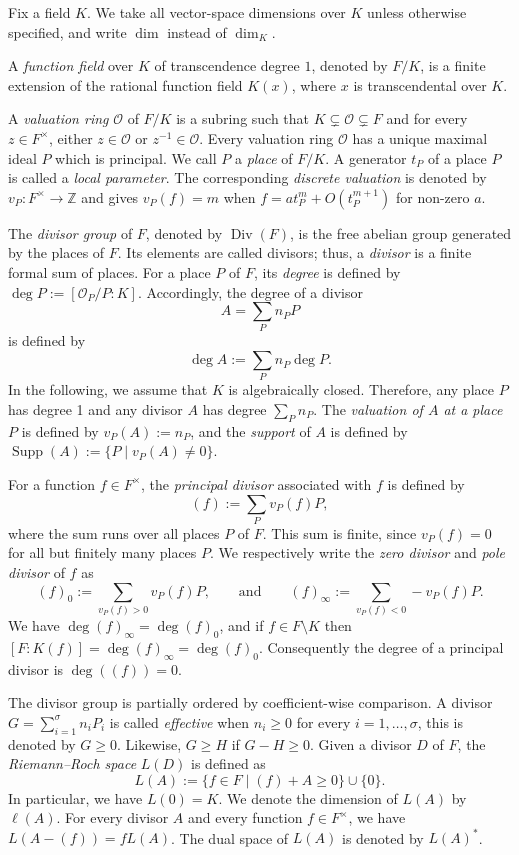 \documentclass[12pt]{amsart}
\renewcommand{\geq}{\geqslant}
\DeclareMathOperator{\Supp}{Supp}
\theoremstyle{definition}
\begin{document}
	Fix a field $K$. We take all vector-space dimensions over $K$ unless otherwise specified, and write $\dim$ instead of $\dim_K$.
	
	A \textit{function field} over $K$ of transcendence degree $1$, denoted by $F/K$, is a finite extension of the rational function field $K(x)$, where $x$ is transcendental over $K$. 
	
	A \textit{valuation ring} $\mathcal{O}$ of $F/K$ is a subring such that $K\subsetneq \mathcal O\subsetneq F$ and for every $z\in F^\times$, either $z\in\mathcal O$ or $z^{-1}\in\mathcal O$. Every valuation ring $\mathcal O$ has a unique maximal ideal $P$ which is principal. We call $P$ a \textit{place} of $F/K$. A generator $t_P$ of a place $P$ is called a \textit{local parameter}. The corresponding \textit{discrete valuation} is denoted by
	$v_P:F^\times\longrightarrow\mathbb Z$ and gives $v_P(f) = m$ when $f = at_P^{m} + O(t_P^{m+1})$ for non-zero $a$.    
	
	The \textit{divisor group} of $F$, denoted by $\operatorname{Div}(F)$, is the free abelian group generated by the places of $F$. Its elements are called divisors; thus, a \textit{divisor} is a finite formal sum of places.
	For a place $P$ of $F$, its \textit{degree} is defined by
	$ \deg P:=[\mathcal O_P/P:K]. $
	Accordingly, the degree of a divisor
	$$ A=\sum_P n_PP $$
	is defined by
	$$ \deg A:=\sum_P n_P\deg P. $$
	In the following,  we assume that $K$ is algebraically closed. Therefore, any place $P$ has degree 1 and any divisor $A$ has degree $\sum_{P} n_P$. The \textit{valuation of $A$ at a place $P$} is defined by $v_P(A):=n_P$, and the \textit{support} of $A$ is defined by $\Supp(A):=\{P\mid v_P(A)\neq 0\}.$
	
	For a function $f\in F^\times$, the \textit{principal divisor} associated with $f$ is defined by
	$$(f):=\sum_P v_P(f)P,$$
	where the sum runs over all places $P$ of $F$.
	This sum is finite, since $v_P(f)=0$ for all but finitely many places $P$. 
	We respectively write the \textit{zero divisor} and \textit{pole divisor} of $f$ as
	$$(f)_0 :=\sum_{ v_P(f)> 0} v_P(f) P, \qquad\text{and}\qquad (f)_\infty :=\sum_{ v_P(f)< 0} - v_P(f) P. $$
	We have $\deg (f)_\infty =\deg (f)_0$, and
	if $f\in F\setminus K$ then $ [F: K (f) ] =\deg (f)_\infty =\deg (f)_0$. 
	Consequently the degree of a principal divisor is $\deg((f)) =0 $. 
	
	The divisor group is partially ordered by coefficient-wise comparison. A divisor $ G=\sum_{i=1}^\sigma n_iP_i $
	is called \textit{effective} when $ n_i\geq 0$ for every $i=1,\ldots,\sigma$, this is denoted by $G \geq 0$. 
	Likewise, $G \ge H$ if $G - H \ge 0$.  
	Given a divisor $D$ of $F$, the \textit{Riemann--Roch space} $ L(D)$ is defined as
	$$ L(A) := \{ f \in F \mid (f) + A \ge 0 \} \cup \{0\}.$$
	In particular, we have $ L( 0)=K$.
	We denote the dimension of ${L} (A)$ by $\ell(A)$. 
	For every divisor $A$ and every function $f\in F^\times$, we have $L(A-(f) ) =fL(A) $. The dual space of $L(A)$ is denoted by $L(A)^\ast$.
	
\end{document}

